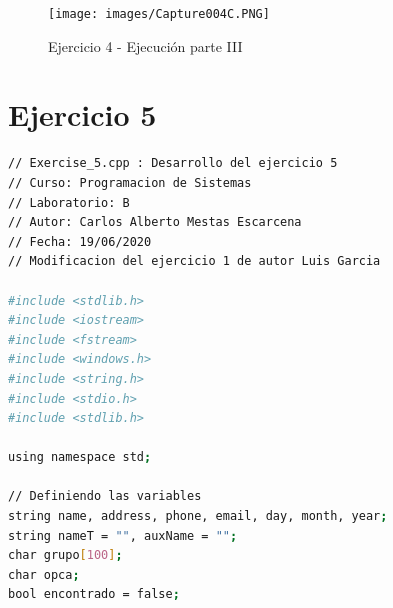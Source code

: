 \documentclass[12pt]{article}
\begin{document}
\begin{figure}[h]
    \centering
    \texttt{[image: images/Capture004C.PNG]}
    \caption{Ejercicio 4 - Ejecución parte III}
\end{figure}

\newpage
\clearpage

\section{Ejercicio 5}

\begin{lstlisting}[language=bash,frame=single,style=CStyle]
// Exercise_5.cpp : Desarrollo del ejercicio 5
// Curso: Programacion de Sistemas
// Laboratorio: B
// Autor: Carlos Alberto Mestas Escarcena
// Fecha: 19/06/2020
// Modificacion del ejercicio 1 de autor Luis Garcia

#include <stdlib.h>
#include <iostream>
#include <fstream>
#include <windows.h>
#include <string.h>
#include <stdio.h>
#include <stdlib.h>

using namespace std;

// Definiendo las variables
string name, address, phone, email, day, month, year;
string nameT = "", auxName = "";
char grupo[100];
char opca;
bool encontrado = false;


\end{lstlisting}
\end{document}
